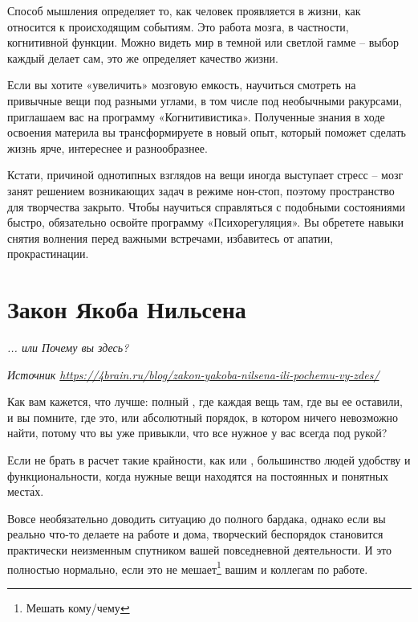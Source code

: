 Способ мышления определяет то, как человек проявляется в жизни, как относится к происходящим событиям. Это работа мозга, в частности, когнитивной функции. Можно видеть мир в темной или светлой гамме – выбор каждый делает сам, это же определяет качество жизни.

Если вы хотите «увеличить» мозговую емкость, научиться смотреть на привычные вещи под разными углами, в том числе под необычными ракурсами, приглашаем вас на программу «Когнитивистика». Полученные знания в ходе освоения материла вы трансформируете в новый опыт, который поможет сделать жизнь ярче, интереснее и разнообразнее.

Кстати, причиной однотипных взглядов на вещи иногда выступает стресс – мозг занят решением возникающих задач в режиме нон-стоп, поэтому пространство для творчества закрыто. Чтобы научиться справляться с подобными состояниями быстро, обязательно освойте программу «Психорегуляция». Вы обретете навыки снятия волнения перед важными встречами, избавитесь от апатии, прокрастинации.



\newpage
\section{Закон Якоба Нильсена}

\textit{... или Почему вы здесь?}

\textit{Источник \url{https://4brain.ru/blog/zakon-yakoba-nilsena-ili-pochemu-vy-zdes/}}

Как вам кажется, что лучше: полный , где каждая вещь  там, где вы ее оставили, и вы помните, где это, или абсолютный порядок, в котором ничего невозможно найти, потому что вы уже привыкли, что все нужное у вас всегда под рукой?

Если не брать в расчет такие крайности, как  или , большинство людей  удобству и функциональности, когда нужные вещи находятся на постоянных и понятных мест\'{а}х.

Вовсе необязательно доводить ситуацию до полного бардака, однако если вы реально что-то делаете на работе и дома, творческий беспорядок становится практически неизменным спутником вашей повседневной деятельности. И это полностью нормально, если это не мешает\footnote{Мешать кому/чему} вашим  и коллегам по работе.

